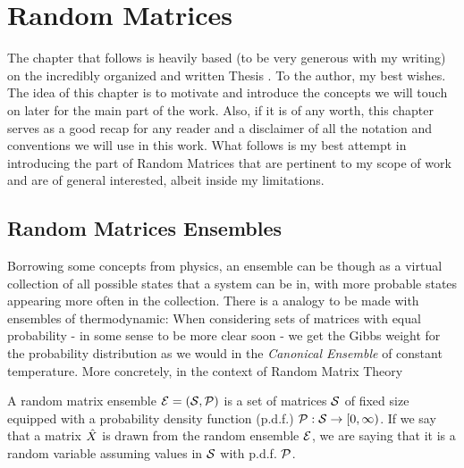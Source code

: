 \section{Random Matrices}

The chapter that follows is heavily based (to be very generous with my writing) on the incredibly organized and written Thesis \cite{rahman2023recursivecharacterisationsrandommatrix}. To the author, my best wishes. The idea of this chapter is to motivate and introduce the concepts we will touch on later for the main part of the work. Also, if it is of any worth, this chapter serves as a good recap for any reader and a disclaimer of all the notation and conventions we will use in this work. What follows is my best attempt in introducing the part of Random Matrices that are pertinent to my scope of work and are of general interested, albeit inside my limitations. 

\subsection{Random Matrices Ensembles}

Borrowing some concepts from physics, an ensemble can be though as a virtual collection of all possible states that a system can be in, with more probable states appearing more often in the collection. There is a analogy to be made with ensembles of thermodynamic: When considering sets of matrices with equal probability - in some sense to be more clear soon - we get the Gibbs weight for the probability distribution as we would in the \textit{Canonical Ensemble} of constant temperature. More concretely, in the context of Random Matrix Theory

\begin{definition}
	A random matrix ensemble $\mathcal{E} = (\mathcal{S}, \mathcal{P})$ is a set of matrices $\mathcal{S}$ of fixed size equipped with a probability density function (p.d.f.) $\mathcal{P}: \mathcal{S} \rightarrow [0, \infty)$. If we say that a matrix $\hat X$ is drawn from the random ensemble $\mathcal{E}$, we are saying that it is a random variable assuming values in $\mathcal{S}$ with p.d.f. $\mathcal{P}$.
	\label{Def: Ensemble}
\end{definition}


